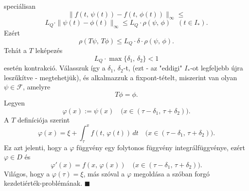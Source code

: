 \documentclass[12pt]{article}
\begin{document}
    speciálisan
    \[
        \| f(t, \, \psi(t)) - f(t, \, \phi(t))\|_\infty \leq
    \]
    \[
        L_Q \cdot \| \psi(t) - \phi(t) \|_\infty \leq L_Q \cdot \rho(\psi, \, \phi) \quad (t \in I_*).
    \]
    Ezért
    \[
        \rho(T\psi, \, T\phi) \leq L_Q \cdot \delta \cdot \rho(\psi, \, \phi).
    \]
    Tehát a $T$ leképezés
    \[
        L_Q \cdot \max \{\delta_1, \, \delta_2\} < 1
    \]
    esetén kontrakció. Válasszuk így a $\delta_1, \, \delta_2$-t, (ezt - az "eddigi" $I_*$-ot legfeljebb újra leszűkítve - megtehetjük), és alkalmazzuk a fixpont-tételt, miszerint van olyan $\psi \in \mathcal{F}$, amelyre
    \[
        T\phi = \phi.
    \]
    Legyen
    \[
        \varphi(x) := \psi(x) \quad \big( x \in (\tau - \delta_1, \, \tau + \delta_2) \big).
    \]
    A $T$ definíciója szerint
    \[
        \varphi(x) = \xi + \int_\tau^x f(t, \, \varphi(t)) \, dt \quad \big( x \in (\tau - \delta_1, \, \tau + \delta_2) \big).
    \]
    Ez azt jelenti, hogy a $\varphi$ függvény egy folytonos függvény integrálfüggvénye, ezért $\varphi \in D$ és
    \[
        \varphi'(x) = f(x, \, \varphi(x)) \quad \big( x \in (\tau - \delta_1, \, \tau + \delta_2) \big).
    \]
    Világos, hogy a $\varphi(\tau) = \xi$, más szóval a $\varphi$ megoldása a szóban forgó kezdetiérték-problémának. $\blacksquare$
    
    
\end{document}
